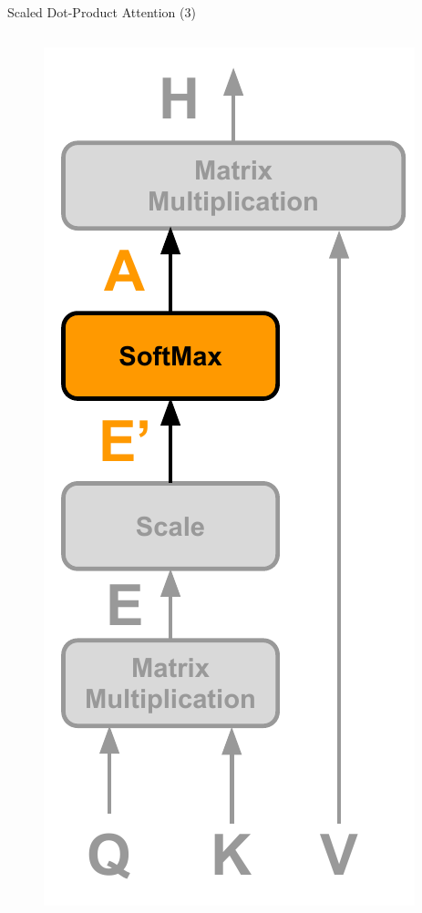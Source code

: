 \documentclass[10pt]{beamer}
\begin{document}
\begin{frame}[fragile]{Scaled Dot-Product Attention (3)}
    \begin{columns}
        \begin{figure}
            \centering
            \includegraphics[width=\textwidth]{figures/model/attention_step3.pdf}
        \end{figure}


\end{columns}
\end{frame}
\end{document}
